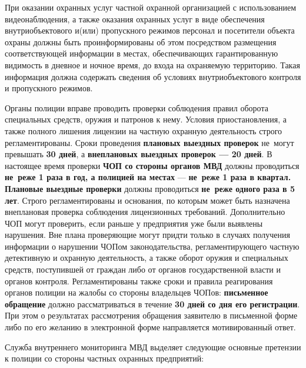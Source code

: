 \documentclass[a4paper,12pt,fleqn]{article} %
\begin{document}
При оказании охранных услуг частной охранной организацией с использованием видеонаблюдения, а также оказания охранных услуг в виде обеспечения внутриобъектового и(или) пропускного режимов персонал и посетители объекта охраны должны быть проинформированы об этом посредством размещения соответствующей информации в местах, обеспечивающих гарантированную видимость в дневное и ночное время, до входа на охраняемую территорию. Такая информация должна содержать сведения об условиях внутриобъектового контроля и пропускного режимов.

Органы полиции вправе проводить проверки соблюдения правил оборота специальных средств, оружия и патронов к нему. Условия приостановления, а также  полного лишения лицензии на частную охранную деятельность строго регламентированы. Сроки проведения \textbf{плановых выездных проверок} не~могут превышать \textbf{30 дней}, а \textbf{внеплановых выездных проверок --- 20 дней}. В настоящее время проверки \textbf{ЧОП со стороны органов МВД} должны проводиться \textbf{не~реже 1 раза в год, а полицией на местах} --- \textbf{не~реже 1 раза в квартал. Плановые выездные проверки} должны проводиться \textbf{не~реже одного раза в 5 лет}. Строго регламентированы и основания, по которым может быть назначена внеплановая проверка соблюдения лицензионных требований. Дополнительно ЧОП могут проверить, если раньше у предприятия уже были выявлены нарушения. Вне плана проверяющие могут придти только в случаях получения информации о нарушении ЧОПом законодательства, регламентирующего частную детективную и охранную деятельность, а также оборот оружия и специальных средств, поступившей от граждан либо от органов государственной власти и органов контроля. Регламентированы также сроки и правила реагирования органов полиции на жалобы со стороны владельцев ЧОПов: \textbf{письменное обращение} должно рассматриваться в течение \textbf{30 дней со дня его регистрации}. При этом о результатах рассмотрения обращения заявителю в письменной форме либо по его желанию в электронной форме направляется мотивированный ответ.

Служба внутреннего мониторинга МВД выделяет следующие основные претензии к полиции со стороны частных охранных предприятий:
\end{document}
